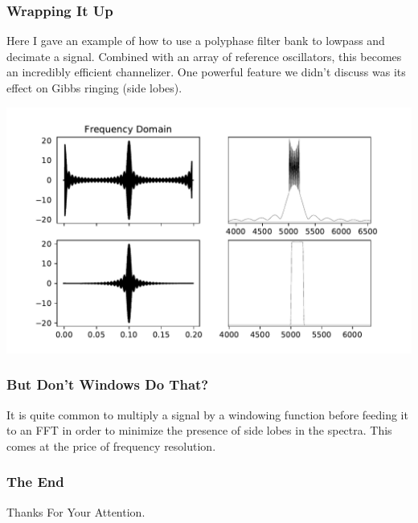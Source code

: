 \documentclass{beamer}
\begin{document}
\begin{frame}
\frametitle{Wrapping It Up}
Here I gave an example of how to use a polyphase filter bank to lowpass and decimate a signal. Combined with an array of reference oscillators, this becomes an incredibly efficient channelizer.  One powerful feature we didn't discuss was its effect on Gibbs ringing (side lobes). 

\includegraphics[scale=.55]{Figure_6.pdf}
\end{frame}

\begin{frame}

\frametitle{But Don't Windows Do That?}
It is quite common to multiply a signal by a windowing function before feeding it to an FFT in order to minimize the presence of side lobes in the spectra.  This comes at the price of frequency resolution.


\end{frame}
\begin{frame}
\frametitle{The End}
\center
\huge Thanks For Your Attention. 
\end{frame}
\end{document}
